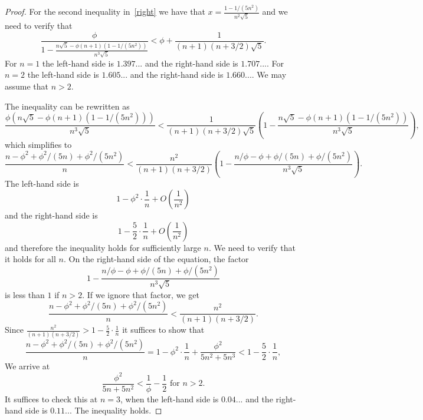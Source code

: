 \documentclass[10pt,a4paper]{amsart}
\begin{document}
\begin{proof}
    For the
    second inequality in~\ref{right} we have that $x=\frac{1-1/(5n^2)}{n^2\sqrt 5}$ and we need to verify that 
    \[
    \frac{\phi}{1-\frac {n\sqrt 5 -\phi(n+1)(1-1/(5n^2))}{n^3\sqrt 5}}<\phi+\frac{1}{(n+1)(n+3/2)\sqrt 5}.
    \]
    For $n=1$ the left-hand side is $1.397...$ and the right-hand side is $1.707...$. For $n=2$ 
    the left-hand side is $1.605...$ and the right-hand side is $1.660...$. 
    We may assume that $n>2$.
    
    The inequality can be rewritten as
    \[
    \frac{\phi(n\sqrt 5 -\phi(n+1)(1-1/(5n^2)))}{n^3\sqrt 5}<\frac{1}{(n+1)(n+3/2)\sqrt 5}\left(1-\frac {n\sqrt 5 -\phi(n+1)(1-1/(5n^2))}{n^3\sqrt 5}\right),
    \]
    which simplifies to
    \[
    \frac{
    n-\phi^2+\phi^2/{(5n)}+\phi^2/(5n^2)}n<\frac{n^2}{(n+1)(n+3/2)}\left(1-\frac {n/\phi -\phi +\phi/(5n)+\phi/(5n^2)}{n^3\sqrt 5}\right).
    \]
    The left-hand side is \[1-\phi^2\cdot \frac{1}{n}+O\left(\frac 1{n^2}\right)\] and the right-hand side is \[1-\frac 52 \cdot \frac 1n+O\left(\frac 1 {n^2}\right)\] and therefore the inequality holds for sufficiently large $n$. We need to verify that it
    holds for all $n$. On the right-hand side of the equation, the factor 
    \[
    1-\frac {n/\phi -\phi +\phi/(5n)+\phi/(5n^2)}{n^3\sqrt 5}
    \]
    is less than $1$ if $n>2$. If we ignore that factor, we get
    \[
    \frac{
    n-\phi^2+\phi^2/{(5n)}+\phi^2/(5n^2)}n<\frac{n^2}{(n+1)(n+3/2)}.
    \]
Since $\frac{n^2}{(n+1)(n+3/2)}>1-\frac 52 \cdot\frac 1n$ it suffices to show that
    \[
    \frac{
    n-\phi^2+\phi^2/{(5n)}+\phi^2/(5n^2)}n=1-\phi^2\cdot\frac 1n +\frac{\phi^2}{5n^2+5n^3}<1-\frac 52 \cdot\frac 1n,
    \]
    We arrive at
    \[
    \frac{\phi^2}{5n+5n^2}<\frac 1\phi-\frac 12 \text{ for }n>2.
    \]
    It suffices to check this at $n=3$, when the left-hand side is $0.04...$ and the right-hand side is $0.11..$.
    The inequality holds.
\end{proof}
\end{document}
